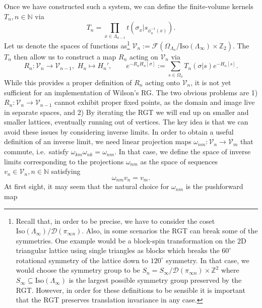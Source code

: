 \documentclass{article}
\newcommand{\Iso}{\mathrm{Iso}}
\begin{document}
Once we have constructed such a system, we can define the finite-volume kernels $T_n,n\in\mathds{N}$ via
\begin{equation}
    T_n=\prod_{x\in\Lambda_{n-1}}t(\sigma_{x}|s_{\phi_n^{-1}(x)}).
\end{equation}
Let us denote the spaces of functions as\footnote{Recall that, in order to be precise, we have to consider the coset $\Iso(\Lambda_\infty)/\mathcal{D}(\pi_{\infty n})$. Also, in some scenarios the RGT can break some of the symmetries. One example would be a block-spin transformation on the $2\mathrm{D}$ triangular lattice using single triangles as blocks which breaks the $60^\circ$ rotational symmetry of the lattice down to $120^\circ$ symmetry. In that case, we would choose the symmetry group to be $S_n=S_\infty/\mathcal{D}(\pi_{\infty n})\times\mathds{Z}^2$ where $S_\infty\subseteq\Iso(\Lambda_\infty)$ is the largest possible symmetry group preserved by the RGT. However, in order for these definitions to be sensible it is important that the RGT preserves translation invariance in any case.} $\mathcal{V}_n:=\mathcal{F}(\Omega_{\Lambda_n}/\Iso(\Lambda_\infty)\times\mathds{Z}_2)$. The $T_n$ then allow us to construct a map $R_n$ acting on $\mathcal{V}_n$ via
\begin{equation}
    R_n:\mathcal{V}_n\to \mathcal{V}_{n-1},\,\, H_n\mapsto H_n',\qquad e^{-R_nH_n[\sigma]}:=\sum_{s\in\Omega_n}T_n(\sigma|s)e^{-H_n[s]}.
\end{equation}
While this provides a proper definition of $R_n$ acting onto $\mathcal{V}_n$, it is not yet sufficient for an implementation of Wilson's RG. The two obvious problems are 1) $R_n:\mathcal{V}_n\to \mathcal{V}_{n-1}$ cannot exhibit proper fixed points, as the domain and image live in separate spaces, and 2) By iterating the RGT we will end up on smaller and smaller lattices, eventually running out of vertices. The key idea is that we can avoid these issues by considering inverse limits. In order to obtain a useful definition of an inverse limit, we need linear projection maps $\omega_{nm}:\mathcal{V}_n\to \mathcal{V}_m$ that commute, i.e.\ satisfy $\omega_{km}\omega_{nk}=\omega_{nm}$. In that case, we define the space of inverse limits corresponding to the projections $\omega_{nm}$ as the space of sequences $v_n\in \mathcal{V}_n,n\in\mathds{N}$ satisfying 
\begin{equation}
    \omega_{nm}v_n=v_m.
\end{equation}
At first sight, it may seem that the natural choice for $\omega_{nm}$ is the pushforward map
\end{document}
